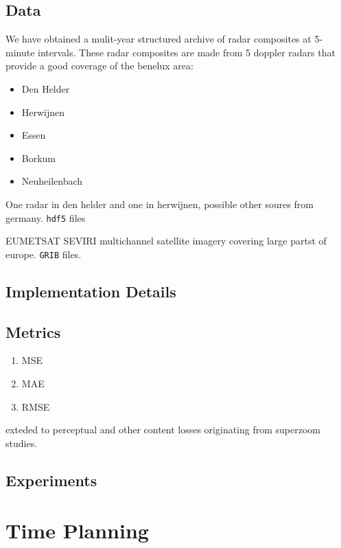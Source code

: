 \documentclass[acmtog, authorversion]{acmart}
\begin{document}
\subsection{Data}

We have obtained a mulit-year structured archive of radar composites at 5-minute intervals. These radar composites are made from 5 doppler radars that provide a good coverage of the benelux area:
\begin{itemize}
    \item Den Helder
    \item Herwijnen
    \item Essen
    \item Borkum
    \item Neuheilenbach
\end{itemize}


One radar in den helder and one in herwijnen, possible other soures from germany. \texttt{hdf5} files

\textsc{EUMETSAT} \textsc{SEVIRI} multichannel satellite imagery covering large partst of europe. \texttt{GRIB} files.

\subsection{Implementation Details}

\subsection{Metrics}

\begin{enumerate}
    \item MSE
    \item MAE
    \item RMSE
\end{enumerate}

exteded to perceptual and other content losses originating from superzoom studies.

\subsection{Experiments}


\section{Time Planning}

\medskip

\begin{ganttchart}{1}{12}
   \\
   \\
   \\
   \\
   \ganttnewline
\end{ganttchart}
\end{document}
